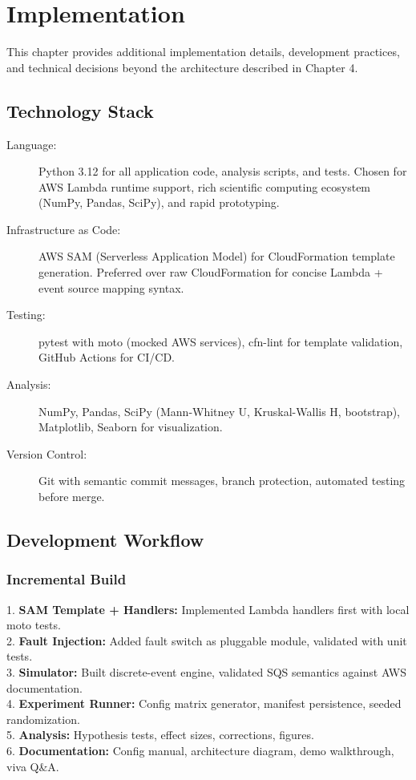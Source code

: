 \chapter{Implementation}

This chapter provides additional implementation details, development practices, and technical decisions beyond the architecture described in Chapter 4.

\section{Technology Stack}

\begin{description}
    \item[Language:] Python 3.12 for all application code, analysis scripts, and tests. Chosen for AWS Lambda runtime support, rich scientific computing ecosystem (NumPy, Pandas, SciPy), and rapid prototyping.
    
    \item[Infrastructure as Code:] AWS SAM (Serverless Application Model) for CloudFormation template generation. Preferred over raw CloudFormation for concise Lambda + event source mapping syntax.
    
    \item[Testing:] pytest with moto (mocked AWS services), cfn-lint for template validation, GitHub Actions for CI/CD.
    
    \item[Analysis:] NumPy, Pandas, SciPy (Mann-Whitney U, Kruskal-Wallis H, bootstrap), Matplotlib, Seaborn for visualization.
    
    \item[Version Control:] Git with semantic commit messages, branch protection, automated testing before merge.
\end{description}

\section{Development Workflow}

\subsection{Incremental Build}

1. \textbf{SAM Template + Handlers:} Implemented Lambda handlers first with local moto tests.\\
2. \textbf{Fault Injection:} Added fault switch as pluggable module, validated with unit tests.\\
3. \textbf{Simulator:} Built discrete-event engine, validated SQS semantics against AWS documentation.\\
4. \textbf{Experiment Runner:} Config matrix generator, manifest persistence, seeded randomization.\\
5. \textbf{Analysis:} Hypothesis tests, effect sizes, corrections, figures.\\
6. \textbf{Documentation:} Config manual, architecture diagram, demo walkthrough, viva Q\&A.

